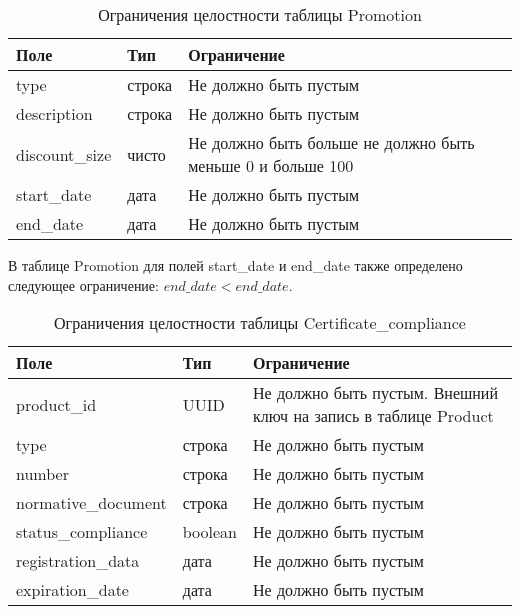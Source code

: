 \begin{table}[ht]
	\begin{center}
		\begin{threeparttable}
			\caption{Ограничения целостности таблицы Promotion}
			\label{tbl:entity_promotion}
			\begin{tabular}{|p{4.5cm}|p{2.5cm}|p{8.5cm}|}
				\hline 
				\textbf{Поле} & \textbf{Тип} & \textbf{Ограничение}  \\
				\hline
				type & строка & Не должно быть пустым  \\
				\hline
				description & строка & Не должно быть пустым  \\
				\hline
				discount\_size & чисто & Не должно быть больше не должно быть меньше 0 и больше 100 \\
				\hline
				start\_date & дата & Не должно быть пустым \\
				\hline
				end\_date & дата & Не должно быть пустым \\
				\hline
			\end{tabular}
		\end{threeparttable}			
	\end{center}
\end{table}

В таблице Promotion для полей start\_date и end\_date также определено следующее ограничение: $ end\_date < end\_date $.

\begin{table}[!h]
	\begin{center}
		\begin{threeparttable}
			\caption{Ограничения целостности таблицы Certificate\_compliance}
			\label{tbl:entity_сertificate_compliance}
			\begin{tabular}{|p{4.5cm}|p{2.5cm}|p{8.5cm}|}
				\hline 
				\textbf{Поле} & \textbf{Тип} & \textbf{Ограничение}  \\
				\hline
				product\_id & UUID & Не должно быть пустым. Внешний ключ на запись в таблице Product  \\
				\hline
				type & строка & Не должно быть пустым  \\
				\hline
				number & строка & Не должно быть пустым  \\
				\hline
				normative\_document & строка & Не должно быть пустым  \\
				\hline
				status\_compliance & boolean & Не должно быть пустым  \\
				\hline
				registration\_data & дата & Не должно быть пустым  \\
				\hline
				expiration\_date & дата & Не должно быть пустым  \\
				\hline
			\end{tabular}
		\end{threeparttable}			
	\end{center}
\end{table}

